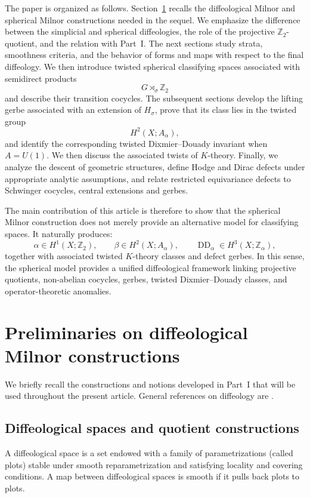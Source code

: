 \documentclass[11pt]{amsart}
\begin{document}
The paper is organized as follows. Section~\ref{sec:prelim} recalls the
diffeological Milnor and spherical Milnor constructions needed in the sequel.
We emphasize the difference between the simplicial and spherical diffeologies,
the role of the projective \(\mathbb Z_2\)-quotient, and the relation with
Part~I. The next sections study strata, smoothness criteria, and the behavior
of forms and maps with respect to the final diffeology. We then introduce
twisted spherical classifying spaces associated with semidirect products
\[
G\rtimes_\sigma \mathbb Z_2
\]
and describe their transition cocycles. The subsequent sections develop the
lifting gerbe associated with an extension of \(H_\sigma\), prove that its
class lies in the twisted group
\[
H^2(X;A_\alpha),
\]
and identify the corresponding twisted Dixmier--Douady invariant when
\(A=U(1)\). We then discuss the associated twists of \(K\)-theory. Finally, we
analyze the descent of geometric structures, define Hodge and Dirac defects
under appropriate analytic assumptions, and relate restricted equivariance
defects to Schwinger cocycles, central extensions and gerbes.

The main contribution of this article is therefore to show that the spherical
Milnor construction does not merely provide an alternative model for
classifying spaces. It naturally produces:
\[
\alpha\in H^1(X;\mathbb Z_2),
\qquad
\beta\in H^2(X;A_\alpha),
\qquad
\operatorname{DD}_\alpha\in H^3(X;\mathbb Z_\alpha),
\]
together with associated twisted \(K\)-theory classes and defect gerbes. In
this sense, the spherical model provides a unified diffeological framework
linking projective quotients, non-abelian cocycles, gerbes, twisted
Dixmier--Douady classes, and operator-theoretic anomalies.
\section{Preliminaries on diffeological Milnor constructions}
\label{sec:prelim}

We briefly recall the constructions and notions developed in Part~I \cite{Magnot-MilnorI} that will
be used throughout the present article. General references on diffeology are
\cite{IglesiasZemmour2013,GMW2023}.

\subsection{Diffeological spaces and quotient constructions}

A diffeological space is a set endowed with a family of parametrizations
(called plots) stable under smooth reparametrization and satisfying locality
and covering conditions. A map between diffeological spaces is smooth if it
pulls back plots to plots.
\end{document}

